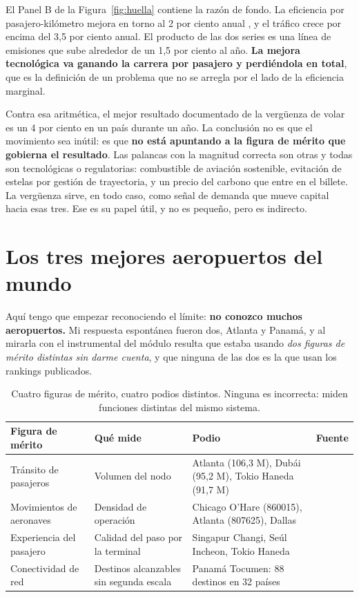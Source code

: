 \documentclass[11pt,letterpaper]{article}
\begin{document}
El Panel B de la Figura~\ref{fig:huella} contiene la razón de fondo. La
eficiencia por pasajero-kilómetro mejora en torno al 2 por ciento anual
\parencite{iata2026eficiencia}, y el tráfico crece por encima del 3,5 por
ciento anual. El producto de las dos series es una línea de emisiones que sube
alrededor de un 1,5 por ciento al año. \textbf{La mejora tecnológica va
ganando la carrera por pasajero y perdiéndola en total}, que es la definición
de un problema que no se arregla por el lado de la eficiencia marginal.

Contra esa aritmética, el mejor resultado documentado de la vergüenza de volar
es un 4 por ciento en un país durante un año. La conclusión no es que el
movimiento sea inútil: es que \textbf{no está apuntando a la figura de mérito
que gobierna el resultado}. Las palancas con la magnitud correcta son otras y
todas son tecnológicas o regulatorias: combustible de aviación sostenible,
evitación de estelas por gestión de trayectoria, y un precio del carbono que
entre en el billete. La vergüenza sirve, en todo caso, como señal de demanda
que mueve capital hacia esas tres. Ese es su papel útil, y no es pequeño, pero
es indirecto.

\section{Los tres mejores aeropuertos del mundo}

Aquí tengo que empezar reconociendo el límite: \textbf{no conozco muchos
aeropuertos.} Mi respuesta espontánea fueron dos, Atlanta y Panamá, y al
mirarla con el instrumental del módulo resulta que estaba usando \emph{dos
figuras de mérito distintas sin darme cuenta}, y que ninguna de las dos es la
que usan los rankings publicados.

\begin{table}[t]
\small
\caption{Cuatro figuras de mérito, cuatro podios distintos. Ninguna es
incorrecta: miden funciones distintas del mismo sistema.}
\label{cuadro:aeropuertos}
\begin{tabularx}{\textwidth}{@{}p{3.5cm}p{3.6cm}XX@{}}
\toprule
\textbf{Figura de mérito} & \textbf{Qué mide} & \textbf{Podio} &
\textbf{Fuente} \\
\midrule
Tránsito de pasajeros
& Volumen del nodo
& Atlanta (106,3 M), Dubái (95,2 M), Tokio Haneda (91,7 M)
& \textcite{aci2026transito} \\
Movimientos de aeronaves
& Densidad de operación
& Chicago O'Hare (\num{860015}), Atlanta (\num{807625}), Dallas
& \textcite{ohare2026} \\
Experiencia del pasajero
& Calidad del paso por la terminal
& Singapur Changi, Seúl Incheon, Tokio Haneda
& \textcite{skytrax2026} \\
Conectividad de red
& Destinos alcanzables sin segunda escala
& Panamá Tocumen: 88 destinos en 32 países
& \textcite{copa2025} \\
\bottomrule
\end{tabularx}
\end{table}
\end{document}
